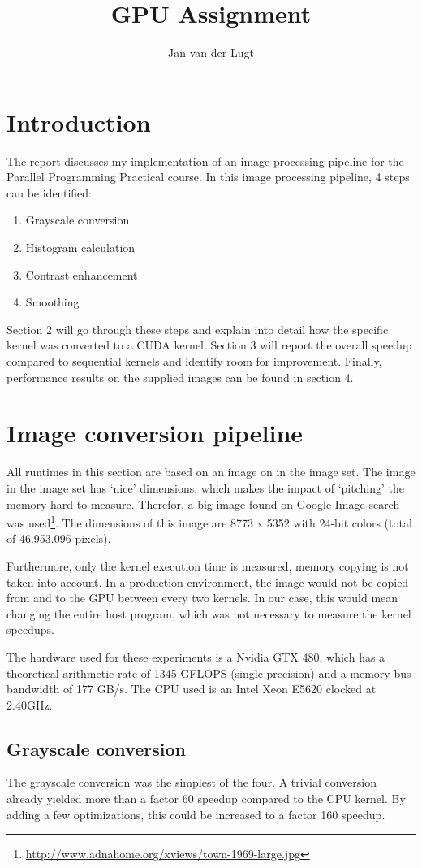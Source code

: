 \documentclass[11pt,a4paper]{article}
\title{GPU Assignment}
\author{Jan van der Lugt}
\date{}
\begin{document}
\maketitle

\section{Introduction}
The report discusses my implementation of an image processing pipeline for the Parallel Programming Practical course. In this image processing pipeline, 4 steps can be identified:
\begin{enumerate}
\item Grayscale conversion
\item Histogram calculation
\item Contrast enhancement
\item Smoothing
\end{enumerate}
Section 2 will go through these steps and explain into detail how the specific kernel was converted to a CUDA kernel. Section 3 will report the overall speedup compared to sequential kernels and identify room for improvement. Finally, performance results on the supplied images can be found in section 4.

\section{Image conversion pipeline}
All runtimes in this section are based on an image on in the image set. The image in the image set has `nice' dimensions, which makes the impact of `pitching' the memory hard to measure. Therefor, a big image found on Google Image search was used\footnote{\url{http://www.adnahome.org/xviews/town-1969-large.jpg}}. The dimensions of this image are 8773 x 5352 with 24-bit colors (total of 46.953.096 pixels).

Furthermore, only the kernel execution time is measured, memory copying is not taken into account. In a production environment, the image would not be copied from and to the GPU between every two kernels. In our case, this would mean changing the entire host program, which was not necessary to measure the kernel speedups.

The hardware used for these experiments is a Nvidia GTX 480, which has a theoretical arithmetic rate of 1345 GFLOPS (single precision) and a memory bus bandwidth of 177 GB/s. The CPU used is an Intel Xeon E5620 clocked at 2.40GHz.

\subsection{Grayscale conversion}
The grayscale conversion was the simplest of the four. A trivial conversion already yielded more than a factor 60 speedup compared to the CPU kernel. By adding a few optimizations, this could be increased to a factor 160 speedup.
\end{document}
